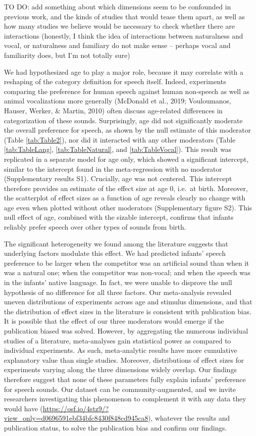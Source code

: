 \documentclass[
  english,
  man]{apa6}
\begin{document}
TO DO: add something about which dimensions seem to be confounded in previous work, and the kinds of studies that would tease them apart, as well as how many studies we believe would be necessary to check whether there are interactions (honestly, I think the idea of interactions between naturalness and vocal, or naturalness and familiary do not make sense -- perhaps vocal and familiarity does, but I'm not totally sure)

We had hypothesized age to play a major role, because it may correlate with a reshaping of the category definition for speech itself. Indeed, experiments comparing the preference for human speech against human non-speech as well as animal vocalizations more generally (McDonald et al., 2019; Vouloumanos, Hauser, Werker, \& Martin, 2010) often discuss age-related differences in categorization of these sounds. Surprisingly, age did not significantly moderate the overall preference for speech, as shown by the null estimate of this moderator (Table \ref{tab:Table2}), nor did it interacted with any other moderators (Table \ref{tab:TableLang}, \ref{tab:TableNatural}, and \ref{tab:TableVocal}). This result was replicated in a separate model for age only, which showed a significant intercept, similar to the intercept found in the meta-regression with no moderator (Supplementary results S1). Crucially, age was not centered. This intercept therefore provides an estimate of the effect size at age 0, i.e.~at birth. Moreover, the scatterplot of effect sizes as a function of age reveals clearly no change with age even when plotted without other moderators (Supplementary figure S2). This null effect of age, combined with the sizable intercept, confirms that infants reliably prefer speech over other types of sounds from birth.

The significant heterogeneity we found among the literature suggests that underlying factors modulate this effect. We had predicted infants' speech preference to be larger when the competitor was an artificial sound than when it was a natural one; when the competitor was non-vocal; and when the speech was in the infants' native language. In fact, we were unable to disprove the null hypothesis of no difference for all three factors. Our meta-analysis revealed uneven distributions of experiments across age and stimulus dimensions, and that the distribution of effect sizes in the literature is consistent with publication bias. It is possible that the effect of our three moderators would emerge if the publication biased was solved. However, by aggregating the numerous individual studies of a literature, meta-analyses gain statistical power as compared to individual experiments. As such, meta-analytic results have more cumulative explanatory value than single studies. Moreover, distributions of effect sizes for experiments varying along the three dimensions widely overlap. Our findings therefore suggest that none of these parameters fully explain infants' preference for speech sounds. Our dataset can be community-augmented, and we invite researchers investigating this phenomenon to complement it with any data they would have (\url{https://osf.io/4stz9/?view_only=d0696591ebf34bfc8430f848cd945ca8}), whatever the results and publication status, to solve the publication bias and confirm our findings.
\end{document}
